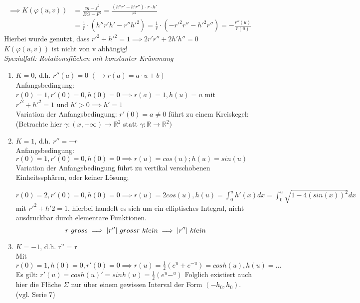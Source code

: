 \documentclass[../main.tex]{subfiles}
\begin{document}
\begin{align*}
    \implies K(\varphi(u,v)) &= \frac{eg-f^{2}}{EG-F^{2}} = \frac{(h''r'-h'r'')\cdot r\cdot h'}{r^{2}}\\
    &= \frac{1}{r}\cdot (h''r'h'-r''h'^{2}) = \frac{1}{r}\cdot (-r'^{2}r''-h'^{2}r'') = -\frac{r''(u)}{r(u)}
\end{align*}
Hierbei wurde genutzt, dass $r'^{2} + h'^{2} = 1 \implies 2r'r'' + 2h'h'' = 0$\\
$K(\varphi(u,v))$ ist nicht von v abhängig!\\
\emph{Spezialfall: Rotationsflächen mit konstanter Krümmung}\\
\begin{enumerate}
     \item $K=0$, d.h. $r''(a)=0$ $(\rightarrow r(a)=a\cdot u+b)$ \\
    Anfangsbedingung: $r(0)=1, r'(0)=0,h(0)=0 \implies r(a)=1, h(u)=u$ mit $r'^{2}+h'^{2}=1$ und $h'>0 \implies h' = 1$\\
    Variation der Anfangsbedingung: $r'(0)=a \neq 0$ führt zu einem Kreiskegel:\\
    (Betrachte hier $\gamma:(x,+\infty)\rightarrow \mathbb{R}^{2}$ statt $\gamma:\mathbb{R}\rightarrow\mathbb{R}^{2})$
    \item $K=1$, d.h. $r''=-r$\\
    Anfangsbedingung: $r(0)=1,r'(0)=0,h(0)=0 \implies r(u)=cos(u); h(u)=sin(u)$\\
    Variation der Anfangsbedingung führt zu vertikal verschobenen Einheitssphären, oder keiner Lösung; \begin{example}
        $r(0)=2, r'(0)=0,h(0)=0 \implies r(u)=2cos(u), h(u)=\int_{0}^{u} h'(x) dx = \int_{0}^{u} \sqrt{1-4(sin(x))^{2}} dx$ mit $r'^{2}+h'{2}=1$, hierbei handelt es sich um ein elliptisches Integral, nicht ausdruckbar durch elementare Funktionen.\\
        $$r \ gross \implies \lvert r''\rvert \ gross\\
          r \ klein \implies \lvert r''\rvert \ klein
        $$
    \end{example}
    \item $K=-1$, d.h. r'' = r\\
    Mit $r(0)=1, h(0)=0,r'(0)=0 \implies r(u)=\frac{1}{2}(e^{u}+e^{-u})=cosh(u),h(u)=\dots$ Es gilt: $r'(u)=cosh(u)'=sinh(u)=\frac{1}{2}(e^{u}-^{u})$ Folglich 
    existiert auch hier die Fläche $\Sigma$ nur über einem gewissen Interval der Form $(-h_{0},h_{0})$. (vgl. Serie 7)
\end{enumerate}
\end{document}
